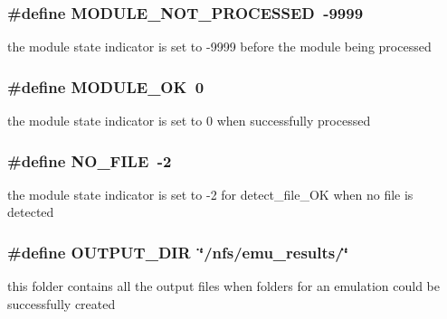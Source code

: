 \subsubsection[{MODULE\_\-NOT\_\-PROCESSED}]{\setlength{\rightskip}{0pt plus 5cm}\#define MODULE\_\-NOT\_\-PROCESSED~-9999}\label{group____useful__macro_g3250a789f13c225a804d272b0b9674c8}


the module state indicator is set to -9999 before the module being processed 

\subsubsection[{MODULE\_\-OK}]{\setlength{\rightskip}{0pt plus 5cm}\#define MODULE\_\-OK~0}\label{group____useful__macro_g2035c06b028261848304fb79a02f6a99}


the module state indicator is set to 0 when successfully processed 

\subsubsection[{NO\_\-FILE}]{\setlength{\rightskip}{0pt plus 5cm}\#define NO\_\-FILE~-2}\label{group____useful__macro_g72e309f412bd15ef82fdba0eb5d1b056}


the module state indicator is set to -2 for detect\_\-file\_\-OK when no file is detected 

\subsubsection[{OUTPUT\_\-DIR}]{\setlength{\rightskip}{0pt plus 5cm}\#define OUTPUT\_\-DIR~\char`\"{}/nfs/emu\_\-results/\char`\"{}}\label{group____useful__macro_gdd836a505b86b88ac52e48d6bece5738}


this folder contains all the output files when folders for an emulation could be successfully created 

